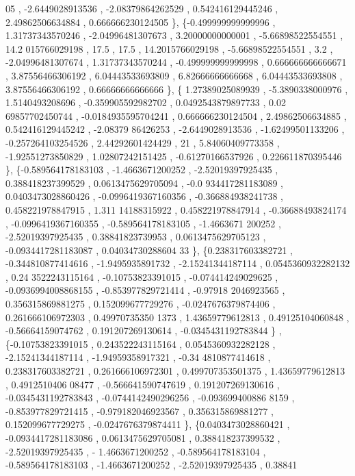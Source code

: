 \begin{DoxyCode}
      05 ,  -2.6449028913536 , -2.08379864262529 , 0.542416129445246 ,  2.49862506634884 , 0.666666230124505 \},
\{-0.499999999999996 ,  1.31737343570246 , -2.04996481307673 ,  3.20000000000001 , -5.66898522554551 ,  14.2
      015766029198 ,              17.5 ,              17.5 ,  14.2015766029198 , -5.66898522554551 ,              
       3.2 , -2.04996481307674 ,  1.31737343570244 , -0.499999999999998 , 0.666666666666671 ,  3.87556466306192 , 
       6.04443533693809 ,  6.82666666666668 ,  6.04443533693808 ,  3.87556466306192 ,  0.66666666666666 \},
\{ 1.27389025089939 ,  -5.3890338000976 ,   1.5140493208696 , -0.359905592982702 , 0.0492543879897733 , 0.02
      69857702450744 , -0.0184935595704241 , 0.666666230124504 ,  2.49862506634885 , 0.542416129445242 ,  -2.08379
      86426253 ,  -2.6449028913536 , -1.62499501133206 , -0.257264103254526 ,  2.44292601424429 ,                
      21 ,  5.84060409773358 , -1.92551273850829 ,  1.02807242151425 , -0.61270166537926 , 0.226611870395446 \},
\{-0.589564178183103 ,  -1.4663671200252 , -2.52019397925435 , 0.388418237399529 , 0.0613475629705094 , -0.0
      934417281183089 , 0.0403473028860426 , -0.0996419367160356 , -0.366884938241738 , 0.458221978847915 ,  1.311
      14188315922 , 0.458221978847914 , -0.36688493824174 , -0.0996419367160355 , -0.589564178183105 ,  -1.4663671
      200252 , -2.52019397925435 ,  0.38841823739953 , 0.0613475629705123 , -0.0934417281183087 , 0.04034730288604
      33 \},
\{0.238317603382721 , -0.344810877414616 ,  -1.9495935891732 , -2.15241344187114 , 0.0545360932282132 , 0.24
      3522243115164 , -0.10753823391015 , -0.074414249029625 , -0.0936994008868155 , -0.853977829721414 , -0.97918
      2046923565 , 0.356315869881275 , 0.152099677729276 , -0.0247676379874406 , 0.261666106972303 , 0.49970735350
      1373 ,  1.43659779612813 ,  0.49125104060848 , -0.56664159074762 , 0.191207269130614 , -0.0345431192783844 \}
      ,
\{-0.10753823391015 , 0.243522243115164 , 0.0545360932282128 , -2.15241344187114 , -1.94959358917321 , -0.34
      4810877414618 , 0.238317603382721 , 0.261666106972301 , 0.499707353501375 ,  1.43659779612813 , 0.4912510406
      08477 , -0.566641590747619 , 0.191207269130616 , -0.0345431192783843 , -0.0744142490296256 , -0.093699400886
      8159 , -0.853977829721415 , -0.979182046923567 , 0.356315869881277 , 0.152099677729275 , -0.0247676379874411
       \},
\{0.0403473028860421 , -0.0934417281183086 , 0.0613475629705081 , 0.388418237399532 , -2.52019397925435 ,  -
      1.4663671200252 , -0.589564178183104 , -0.589564178183103 ,  -1.4663671200252 , -2.52019397925435 ,  0.38841

\end{DoxyCode}
